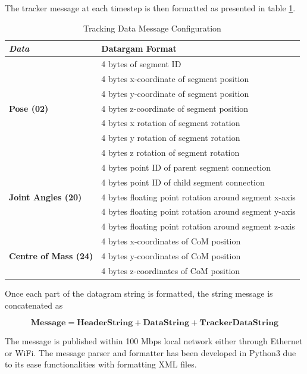 The tracker message at each timestep is then formatted as presented in table \ref{tab: tracker-message-format}.
\begin{table}[h!]
    \label{tab: tracker-message-format}
    \centering
    \begin{tabular}{|l|l|}
        \hline
        \textbf{\textit{Data}} & \textbf{Datargam Format} \\
        \hline
        \multirow{7}{*}{\textbf{Pose (02)}}
        &4 bytes of segment ID \\
        &4 bytes x-coordinate of segment position \\
        &4 bytes y-coordinate of segment position \\
        &4 bytes z-coordinate of segment position \\
        &4 bytes x rotation of segment rotation \\
        &4 bytes y rotation of segment rotation \\
        &4 bytes z rotation of segment rotation \\
        \hline 
        \multirow{5}{*}{\textbf{Joint Angles (20)}}
        &4 bytes point ID of parent segment connection \\
        &4 bytes point ID of child segment connection \\
        &4 bytes floating point rotation around segment x-axis \\
        &4 bytes floating point rotation around segment y-axis \\
        &4 bytes floating point rotation around segment z-axis\\
        \hline
        \multirow{3}{*}{\textbf{Centre of Mass (24)}}
        &4 bytes x-coordinates of CoM position \\
        &4 bytes y-coordinates of CoM position \\
        &4 bytes z-coordinates of CoM position \\
        \hline
    \end{tabular}
    \caption{Tracking Data Message Configuration}
\end{table}

Once each part of the datagram string is formatted, the string message is concatenated as

$$\mathbf{Message = Header String + Data String + Tracker Data String}$$

The message is published within 100 Mbps local network either through Ethernet or WiFi. The message parser
and formatter has been developed in Python3 due to its ease functionalities with formatting XML files.


